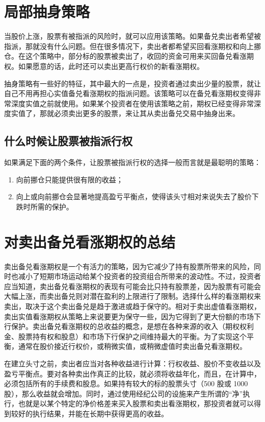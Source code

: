 \section{局部抽身策略}
当股价上涨，股票有被指派的风险时，就可以应用该策略。如果备兑卖出者希望被指派，那就没有什么问题。但在很多情况下，卖出者都希望买回看涨期权和向上挪仓。在这个策略中，部分标的股票被卖出了，收回的资金可用来买回备兑看涨期权。如果愿意的话，此时还可以卖出更高行权价的新看涨期权。

抽身策略有一些好的特征，其中最大的一点是，投资者通过卖出少量的股票，就让自己不用再担心实值备兑看涨期权的指派问题。该策略可以在备兑看涨期权变得非常深度实值之前就使用。如果某个投资者在使用该策略之前，期权已经变得非常深度实值了，那就必须卖出更多的股票，来让其从卖出备兑交易中抽身出来。
\subsection{什么时候让股票被指派行权}
如果满足下面的两个条件，让股票被指派行权的选择一般而言就是最聪明的策略：
\begin{enumerate}
    \item 向前挪仓只能提供很有限的收益；
    \item 向上或向前挪仓会显著地提高盈亏平衡点，使得该头寸相对来说失去了股价下跌时所需的保护。
\end{enumerate}

\section{对卖出备兑看涨期权的总结}

卖出备兑看涨期权是一个有活力的策略，因为它减少了持有股票所带来的风险，同时也减小了短期市场运动给某个投资者的投资组合所带来的波动性。不过，投资者应当知道，卖出备兑看涨期权的表现有可能会比只持有股票差，因为股票有可能会大幅上涨，而卖出备兑则对潜在盈利的上限进行了限制。选择什么样的看涨期权来卖出，取决于这个卖出备兑是趋于激进或趋于保守的。相对于卖出虚值看涨期权，卖出实值看涨期权从策略上来说要更为保守一些，因为它得到了更大份额的市场下行保护。卖出备兑看涨期权的总收益的概念，是想在各种来源的收入（期权权利金、股票持有权和股息）和市场下行保护之间维持最大的平衡。为了实现这个平衡，通常在股价接近行权价，或稍微实值，或稍微虚值时卖出备兑看涨期权。

在建立头寸之前，卖出者应当对各种收益进行计算：行权收益、股价不变收益以及盈亏平衡点。要对各种卖出作真正的比较，就必须将收益年化，而且，在计算中，必须包括所有的手续费和股息。如果持有较大的标的股票头寸（500 股或 1000 股），那么收益就会增加。同时，通过使用经纪公司的设施来产生所谓的“净”执行，也就是以某个特定的净价格差来买入股票和卖出看涨期权，那投资者就可以得到较好的执行结果，并能在长期中获得更高的收益。

